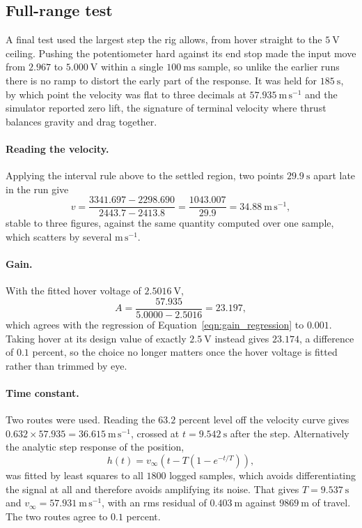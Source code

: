\subsection{Full-range test}
A final test used the largest step the rig allows, from hover straight to the $5\ \mathrm{V}$
ceiling. Pushing the potentiometer hard against its end stop made the input move from $2.967$ to
$5.000\ \mathrm{V}$ within a single $100\ \mathrm{ms}$ sample, so unlike the earlier runs there is
no ramp to distort the early part of the response. It was held for $185\ \mathrm{s}$, by which
point the velocity was flat to three decimals at $57.935\ \mathrm{m\,s^{-1}}$ and the simulator
reported zero lift, the signature of terminal velocity where thrust balances gravity and drag
together.

\paragraph{Reading the velocity.} Applying the interval rule above to the settled region, two
points $29.9\ \mathrm{s}$ apart late in the run give
\begin{equation}\label{eqn:dhdt_worked}
    v = \frac{3341.697 - 2298.690}{2443.7 - 2413.8} = \frac{1043.007}{29.9}
      = 34.88\ \mathrm{m\,s^{-1}} ,
\end{equation}
stable to three figures, against the same quantity computed over one sample, which scatters by
several $\mathrm{m\,s^{-1}}$.

\paragraph{Gain.} With the fitted hover voltage of $2.5016\ \mathrm{V}$,
\begin{equation}
    A = \frac{57.935}{5.0000 - 2.5016} = 23.197 ,
\end{equation}
which agrees with the regression of Equation~\eqref{eqn:gain_regression} to $0.001$. Taking
hover at its design value of exactly $2.5\ \mathrm{V}$ instead gives $23.174$, a difference of
$0.1$ percent, so the choice no longer matters once the hover voltage is fitted rather than
trimmed by eye.

\paragraph{Time constant.} Two routes were used. Reading the $63.2$ percent level off the velocity
curve gives $0.632 \times 57.935 = 36.615\ \mathrm{m\,s^{-1}}$, crossed at $t = 9.542\ \mathrm{s}$
after the step. Alternatively the analytic step response of the position,
\begin{equation}\label{eqn:height_fit}
    h(t) = v_\infty \left( t - T \left( 1 - e^{-t/T} \right) \right) ,
\end{equation}
was fitted by least squares to all $1800$ logged samples, which avoids differentiating the signal
at all and therefore avoids amplifying its noise. That gives $T = 9.537\ \mathrm{s}$ and
$v_\infty = 57.931\ \mathrm{m\,s^{-1}}$, with an rms residual of $0.403\ \mathrm{m}$ against
$9869\ \mathrm{m}$ of travel. The two routes agree to $0.1$ percent.

